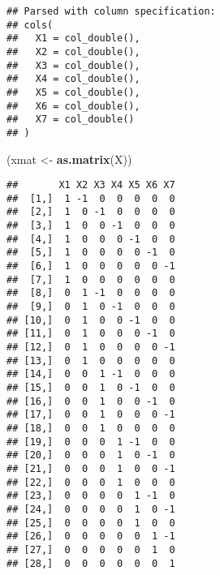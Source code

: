 \documentclass[
]{article}
\newenvironment{Shaded}{\begin{snugshade}}{\end{snugshade}}
\newcommand{\KeywordTok}[1]{\textcolor[rgb]{0.13,0.29,0.53}{\textbf{#1}}}
\newcommand{\NormalTok}[1]{#1}
\newcommand{\StringTok}[1]{\textcolor[rgb]{0.31,0.60,0.02}{#1}}
\begin{document}
\begin{verbatim}
## Parsed with column specification:
## cols(
##   X1 = col_double(),
##   X2 = col_double(),
##   X3 = col_double(),
##   X4 = col_double(),
##   X5 = col_double(),
##   X6 = col_double(),
##   X7 = col_double()
## )
\end{verbatim}

\begin{Shaded}
\begin{Highlighting}[]
\NormalTok{(xmat <-}\StringTok{ }\KeywordTok{as.matrix}\NormalTok{(X))}
\end{Highlighting}
\end{Shaded}

\begin{verbatim}
##       X1 X2 X3 X4 X5 X6 X7
##  [1,]  1 -1  0  0  0  0  0
##  [2,]  1  0 -1  0  0  0  0
##  [3,]  1  0  0 -1  0  0  0
##  [4,]  1  0  0  0 -1  0  0
##  [5,]  1  0  0  0  0 -1  0
##  [6,]  1  0  0  0  0  0 -1
##  [7,]  1  0  0  0  0  0  0
##  [8,]  0  1 -1  0  0  0  0
##  [9,]  0  1  0 -1  0  0  0
## [10,]  0  1  0  0 -1  0  0
## [11,]  0  1  0  0  0 -1  0
## [12,]  0  1  0  0  0  0 -1
## [13,]  0  1  0  0  0  0  0
## [14,]  0  0  1 -1  0  0  0
## [15,]  0  0  1  0 -1  0  0
## [16,]  0  0  1  0  0 -1  0
## [17,]  0  0  1  0  0  0 -1
## [18,]  0  0  1  0  0  0  0
## [19,]  0  0  0  1 -1  0  0
## [20,]  0  0  0  1  0 -1  0
## [21,]  0  0  0  1  0  0 -1
## [22,]  0  0  0  1  0  0  0
## [23,]  0  0  0  0  1 -1  0
## [24,]  0  0  0  0  1  0 -1
## [25,]  0  0  0  0  1  0  0
## [26,]  0  0  0  0  0  1 -1
## [27,]  0  0  0  0  0  1  0
## [28,]  0  0  0  0  0  0  1
\end{verbatim}
\end{document}
